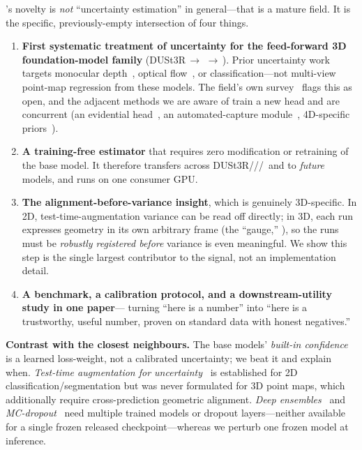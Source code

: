 \trustr's novelty is \emph{not} ``uncertainty estimation'' in general---that is a mature field. It is
the specific, previously-empty intersection of four things.

\begin{enumerate}[leftmargin=1.5em,itemsep=2pt,topsep=2pt]
\item \textbf{First systematic treatment of uncertainty for the feed-forward 3D
foundation-model family} (DUSt3R\,$\rightarrow$\,\vggt\,$\rightarrow$\,\pii). Prior uncertainty work
targets monocular depth~\cite{poggi}, optical flow~\cite{ilg}, or classification---not multi-view
point-map regression from these models. The field's own survey~\cite{survey3d} flags this as open,
and the adjacent methods we are aware of train a new head and are concurrent (an evidential
head~\cite{trust3r_evidential}, an automated-capture module~\cite{auto3r}, 4D-specific
priors~\cite{robust4d}).
\item \textbf{A training-free estimator} that requires zero modification or retraining of the base
model. It therefore transfers across DUSt3R/\mastr/\vggt/\pii\ and to \emph{future} models, and runs
on one consumer GPU.
\item \textbf{The alignment-before-variance insight}, which is genuinely 3D-specific. In 2D,
test-time-augmentation variance can be read off directly; in 3D, each run expresses geometry in its
own arbitrary frame (the ``gauge,'' ), so the runs must be \emph{robustly
registered before} variance is even meaningful. We show this step is the single largest contributor
to the signal, not an implementation detail.
\item \textbf{A benchmark, a calibration protocol, and a downstream-utility study in one paper}---
turning ``here is a number'' into ``here is a trustworthy, useful number, proven on standard data
with honest negatives.''
\end{enumerate}

\noindent\textbf{Contrast with the closest neighbours.} The base models' \emph{built-in confidence}
is a learned loss-weight, not a calibrated uncertainty; we beat it and explain when. \emph{Test-time
augmentation for uncertainty}~\cite{ayhan,ttaaleatoric} is established for 2D
classification/segmentation but was never formulated for 3D point maps, which additionally require
cross-prediction geometric alignment. \emph{Deep ensembles}~\cite{ensembles} and
\emph{MC-dropout}~\cite{mcdropout} need multiple trained models or dropout layers---neither available
for a single frozen released checkpoint---whereas we perturb one frozen model at inference.

